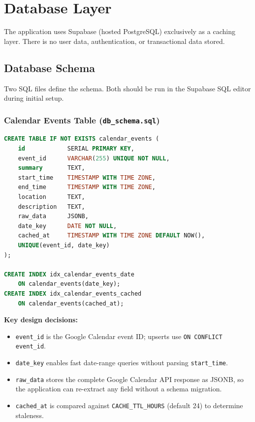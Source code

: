 \documentclass[12pt]{article}
\begin{document}
\section{Database Layer}

The application uses Supabase (hosted PostgreSQL) exclusively as a caching layer. There is no user data, authentication, or transactional data stored.

\subsection{Database Schema}

Two SQL files define the schema. Both should be run in the Supabase SQL editor during initial setup.

\subsubsection{Calendar Events Table (\texttt{db\_schema.sql})}

\begin{lstlisting}[language=SQL, basicstyle=\ttfamily\footnotesize]
CREATE TABLE IF NOT EXISTS calendar_events (
    id            SERIAL PRIMARY KEY,
    event_id      VARCHAR(255) UNIQUE NOT NULL,
    summary       TEXT,
    start_time    TIMESTAMP WITH TIME ZONE,
    end_time      TIMESTAMP WITH TIME ZONE,
    location      TEXT,
    description   TEXT,
    raw_data      JSONB,
    date_key      DATE NOT NULL,
    cached_at     TIMESTAMP WITH TIME ZONE DEFAULT NOW(),
    UNIQUE(event_id, date_key)
);

CREATE INDEX idx_calendar_events_date
    ON calendar_events(date_key);
CREATE INDEX idx_calendar_events_cached
    ON calendar_events(cached_at);
\end{lstlisting}

\textbf{Key design decisions:}
\begin{itemize}
    \item \texttt{event\_id} is the Google Calendar event ID; upserts use \texttt{ON CONFLICT event\_id}.
    \item \texttt{date\_key} enables fast date-range queries without parsing \texttt{start\_time}.
    \item \texttt{raw\_data} stores the complete Google Calendar API response as JSONB, so the application can re-extract any field without a schema migration.
    \item \texttt{cached\_at} is compared against \texttt{CACHE\_TTL\_HOURS} (default 24) to determine staleness.
\end{itemize}
\end{document}
